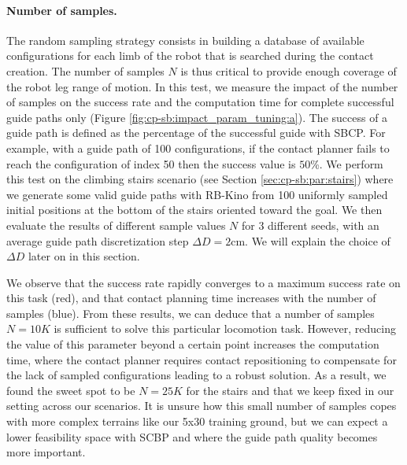 \paragraph{Number of samples.}
The random sampling strategy consists in building a database of available configurations for each limb of the robot that is searched during the contact creation.
The number of samples $N$ is thus critical to provide enough coverage of the robot leg range of motion.
In this test, we measure the impact of the number of samples on the success rate and the computation time for complete successful guide paths only (Figure \ref{fig:cp-sb:impact_param_tuning:a}).
The success of a guide path is defined as the percentage of the successful guide with SBCP. For example, with a guide path of 100 configurations, if the contact planner fails to reach the configuration of index 50 then the success value is $50$\%.
We perform this test on the climbing stairs scenario (see Section \ref{sec:cp-sb:par:stairs}) where we generate some valid guide paths with RB-Kino from 100 uniformly sampled initial positions at the bottom of the stairs oriented toward the goal. 
We then evaluate the results of different sample values $N$ for 3 different seeds, with an average guide path discretization step $\Delta D = 2$cm. 
We will explain the choice of $\Delta D$ later on in this section.

We observe that the success rate rapidly converges to a maximum success rate on this task (red), and that contact planning time increases with the number of samples (blue).
From these results, we can deduce that a number of samples $N=10K$ is sufficient to solve this particular locomotion task.
However, reducing the value of this parameter beyond a certain point increases the computation time, where the contact planner requires contact repositioning to compensate for the lack of sampled configurations leading to a robust solution.
As a result, we found the sweet spot to be $N=25K$ for the stairs and that we keep fixed in our setting across our scenarios. 
It is unsure how this small number of samples copes with more complex terrains like our 5x30 training ground, but we can expect a lower feasibility space with SCBP and where the guide path quality becomes more important.


